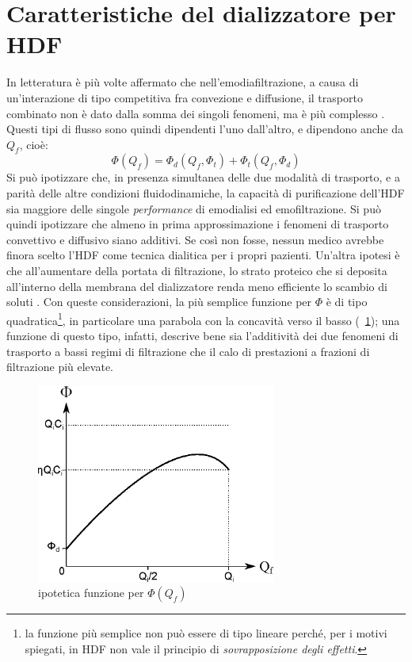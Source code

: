 \section{Caratteristiche del dializzatore per HDF}\label{sec:HDF}
In letteratura è più volte affermato che nell'emodiafiltrazione, a causa di un'interazione di tipo competitiva fra convezione e diffusione, il trasporto combinato non è dato dalla somma dei singoli fenomeni, ma è più complesso \cite{hoenich,canaud}. Questi tipi di flusso sono quindi dipendenti l'uno dall'altro, e dipendono anche da $Q_f$, cioè:
\begin{equation}\label{phidf}
	\Phi(Q_f) = \Phi_d(Q_f,\Phi_t) + \Phi_t(Q_f,\Phi_d)
\end{equation}
Si può ipotizzare che, in presenza simultanea delle due modalità di trasporto, e a parità delle altre condizioni fluidodinamiche, la capacità di purificazione dell'HDF sia maggiore delle singole \textit{performance} di emodialisi ed emofiltrazione. Si può quindi ipotizzare che almeno in prima approssimazione i fenomeni di trasporto convettivo e diffusivo siano additivi. Se così non fosse, nessun medico avrebbe finora scelto l'HDF come tecnica dialitica per i propri pazienti. Un'altra ipotesi è che all'aumentare della portata di filtrazione, lo strato proteico che si deposita all'interno della membrana del dializzatore renda meno efficiente lo scambio di soluti \cite{colton}. Con queste considerazioni, la più semplice funzione per $\Phi$ è di tipo quadratica\footnote{la funzione più semplice non può essere di tipo lineare perché, per i motivi spiegati, in HDF non vale il principio di \textit{sovrapposizione degli effetti}.}, in particolare una parabola con la concavità verso il basso (\figurename~\ref{fig:PHI}); una funzione di questo tipo, infatti, descrive bene sia l'additività dei due fenomeni di trasporto a bassi regimi di filtrazione che il calo di prestazioni a frazioni di filtrazione più elevate.
\begin{figure}[htbp]
	\centering
		\includegraphics[width=0.70\textwidth]{immagini/hp_hdf.eps}
	\caption{ipotetica funzione per $\Phi(Q_f)$}
	\label{fig:PHI}
\end{figure}

